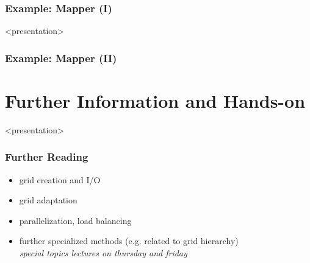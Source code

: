 \documentclass[aspectratio=169,11pt]{beamer}
\theoremstyle{definition}
\begin{document}
\begin{frame} \frametitle{Example: Mapper (I)}
\scriptsize
\begin{codeblock}
  
\end{codeblock}
\end{frame}

\begin{onlyenv}<presentation>
\begin{frame} \frametitle{Example: Mapper (II)}
\scriptsize
\begin{codeblock}
  
\end{codeblock}
\end{frame}
\end{onlyenv}

\section{Further Information and Hands-on}

\begin{onlyenv}<presentation>
  \begin{frame}
    \frametitle{Further Reading}
    \begin{itemize}
    \item grid creation and I/O\\
      \medskip
      \pause\pause
      \bigskip
    \item grid adaptation
      \medskip
    \item parallelization, load balancing
      \medskip
    \item further specialized methods (e.g. related to grid hierarchy)\\
      \pause
      \medskip
      \rightarrownice \emph{special topics lectures on thursday and friday}
    \end{itemize}
  \end{frame}
\end{onlyenv}
\end{document}
